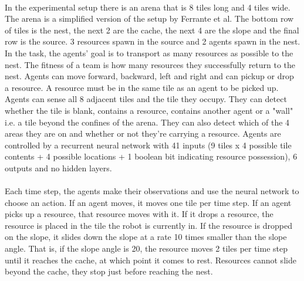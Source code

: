 \documentclass[sigconf]{aamas}  %
\begin{document}
\paragraph{}
In the experimental setup there is an arena that is 8 tiles long and 4 tiles wide. The arena is a simplified version of the setup by Ferrante et al. The bottom row of tiles is the nest, the next 2 are the cache, the next 4 are the slope and the final row is the source. 3 resources spawn in the source and 2 agents spawn in the nest. In the task, the agents' goal is to transport as many resources as possible to the nest. The fitness of a team is how many resources they successfully return to the nest. Agents can move forward, backward, left and right and can pickup or drop a resource. A resource must be in the same tile as an agent to be picked up. Agents can sense all 8 adjacent tiles and the tile they occupy. They can detect whether the tile is blank, contains a resource, contains another agent or a "wall" i.e. a tile beyond the confines of the arena. They can also detect which of the 4 areas they are on and whether or not they're carrying a resource. Agents are controlled by a recurrent neural network with 41 inputs (9 tiles x 4 possible tile contents + 4 possible locations + 1 boolean bit indicating resource possession), 6 outputs and no hidden layers. 

\paragraph{}
Each time step, the agents make their observations and use the neural network to choose an action. If an agent moves, it moves one tile per time step. If an agent picks up a resource, that resource moves with it. If it drops a resource, the resource is placed in the tile the robot is currently in. If the resource is dropped on the slope, it slides down the slope at a rate 10 times smaller than the slope angle. That is, if the slope angle is 20, the resource moves 2 tiles per time step until it reaches the cache, at which point it comes to rest. Resources cannot slide beyond the cache, they stop just before reaching the nest. 
\end{document}
